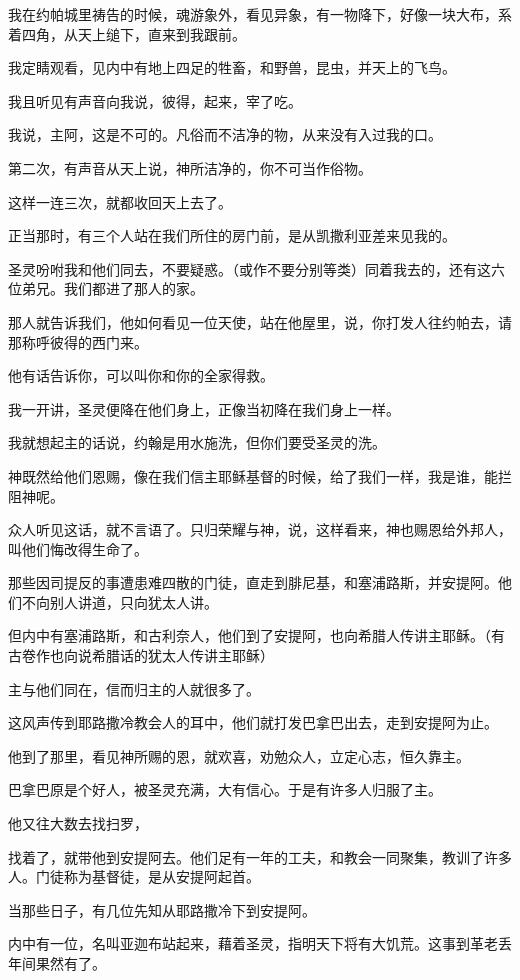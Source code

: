 \documentclass[12pt,oneside]{book}
\begin{document}
我在约帕城里祷告的时候，魂游象外，看见异象，有一物降下，好像一块大布，系着四角，从天上缒下，直来到我跟前。

我定睛观看，见内中有地上四足的牲畜，和野兽，昆虫，并天上的飞鸟。

我且听见有声音向我说，彼得，起来，宰了吃。

我说，主阿，这是不可的。凡俗而不洁净的物，从来没有入过我的口。

第二次，有声音从天上说，神所洁净的，你不可当作俗物。

这样一连三次，就都收回天上去了。

正当那时，有三个人站在我们所住的房门前，是从凯撒利亚差来见我的。

圣灵吩咐我和他们同去，不要疑惑。（或作不要分别等类）同着我去的，还有这六位弟兄。我们都进了那人的家。

那人就告诉我们，他如何看见一位天使，站在他屋里，说，你打发人往约帕去，请那称呼彼得的西门来。

他有话告诉你，可以叫你和你的全家得救。

我一开讲，圣灵便降在他们身上，正像当初降在我们身上一样。

我就想起主的话说，约翰是用水施洗，但你们要受圣灵的洗。

神既然给他们恩赐，像在我们信主耶稣基督的时候，给了我们一样，我是谁，能拦阻神呢。

众人听见这话，就不言语了。只归荣耀与神，说，这样看来，神也赐恩给外邦人，叫他们悔改得生命了。

那些因司提反的事遭患难四散的门徒，直走到腓尼基，和塞浦路斯，并安提阿。他们不向别人讲道，只向犹太人讲。

但内中有塞浦路斯，和古利奈人，他们到了安提阿，也向希腊人传讲主耶稣。（有古卷作也向说希腊话的犹太人传讲主耶稣）

主与他们同在，信而归主的人就很多了。

这风声传到耶路撒冷教会人的耳中，他们就打发巴拿巴出去，走到安提阿为止。

他到了那里，看见神所赐的恩，就欢喜，劝勉众人，立定心志，恒久靠主。

巴拿巴原是个好人，被圣灵充满，大有信心。于是有许多人归服了主。

他又往大数去找扫罗，

找着了，就带他到安提阿去。他们足有一年的工夫，和教会一同聚集，教训了许多人。门徒称为基督徒，是从安提阿起首。

当那些日子，有几位先知从耶路撒冷下到安提阿。

内中有一位，名叫亚迦布站起来，藉着圣灵，指明天下将有大饥荒。这事到革老丢年间果然有了。
\end{document}
